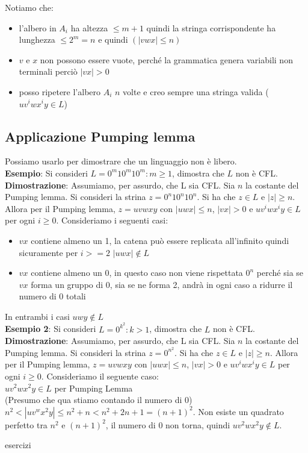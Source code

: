 \documentclass[12pt]{article}
\begin{document}
Notiamo che: 
\begin{itemize}
  \item l'albero in $A_i$ ha altezza $\leq m+1$ quindi la stringa corrispondente ha lunghezza $\leq 2^m = n$ e quindi $(|vwx| \leq n)$
  \item $v$ e $x$ non possono essere vuote, perché la grammatica genera variabili non terminali perciò $|vx| >0$
  \item posso ripetere l'albero $A_i$ $n$ volte e creo sempre una stringa valida ($uv^i wx^i y \in L$)
\end{itemize}

\subsection{Applicazione Pumping lemma}
Possiamo usarlo per dimostrare che un linguaggio non è libero.
\vspace{2mm}
\\ \textbf{Esempio}: Si consideri $L={0^m 10^m 10^m :m \geq 1}$, dimostra che $L$ non è CFL.
\\ \textbf{Dimostrazione}: Assumiamo, per assurdo, che L sia CFL. Sia $n$ la costante del Pumping lemma. Si consideri la strina $z=0^n 10^n 10^n$. Si ha che $z \in L$ e $|z| \geq n$. Allora per il Pumping lemma, $z=uvwxy$ con $|uwx| \leq n$, $|vx| >0$ e $uv^i wx^i y \in L$ per ogni $i \geq 0$. Consideriamo i seguenti casi: 
\begin{itemize}
  \item $vx$ contiene almeno un 1, la catena può essere replicata all'infinito quindi sicuramente per $i>=2$ $|uwx| \notin L$
  \item $vx$ contiene almeno un 0, in questo caso non viene rispettata $0^n$ perché sia se $vx$ forma un gruppo di 0, sia se ne forma 2, andrà in ogni caso a ridurre il numero di 0 totali
\end{itemize}
In entrambi i casi $uwy \notin L$
\vspace{2mm}
\\ \textbf{Esempio 2}: Si consideri $L={0^{k^2}:k>1}$, dimostra che $L$ non è CFL.
\\ \textbf{Dimostrazione}: Assumiamo, per assurdo, che L sia CFL. Sia $n$ la costante del Pumping lemma. Si consideri la strina $z=0^{n^2}$. Si ha che $z \in L$ e $|z| \geq n$. Allora per il Pumping lemma, $z=uvwxy$ con $|uwx| \leq n$, $|vx| >0$ e $uv^i wx^i y \in L$ per ogni $i \geq 0$. Consideriamo il seguente caso:
\\ $uv^2wx^2y \in L$ per Pumping Lemma
\\ (Presumo che qua stiamo contando il numero di 0) $n^2 < |uv^wx^2y| \leq n^2+n < n^2 + 2n + 1 = (n+1)^2$. Non esiste un quadrato perfetto tra $n^2$ e $(n+1)^2$, il numero di 0 non torna, quindi $uv^2wx^2y \notin L$.




\newpage
{esercizi}
\end{document}
